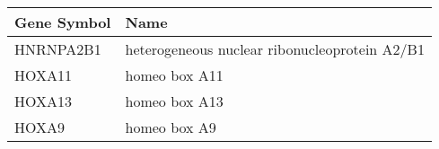 \begin{tabular}{ll}
\toprule
Gene Symbol &                                          Name \\
\midrule
  HNRNPA2B1 & heterogeneous nuclear ribonucleoprotein A2/B1 \\
     HOXA11 &                                 homeo box A11 \\
     HOXA13 &                                 homeo box A13 \\
      HOXA9 &                                  homeo box A9 \\
\bottomrule
\end{tabular}
